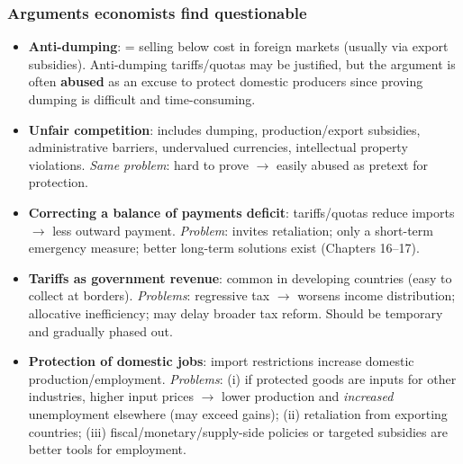 \subsubsection*{Arguments economists find questionable}
\begin{itemize}
  \item \textbf{Anti-dumping}:  = selling below cost in foreign markets (usually via export subsidies). Anti-dumping tariffs/quotas may be justified, but the argument is often \textbf{abused} as an excuse to protect domestic producers since proving dumping is difficult and time-consuming.
  \item \textbf{Unfair competition}: includes dumping, production/export subsidies, administrative barriers, undervalued currencies, intellectual property violations. \textit{Same problem}: hard to prove $\to$ easily abused as pretext for protection.
  \item \textbf{Correcting a balance of payments deficit}: tariffs/quotas reduce imports $\to$ less outward payment. \textit{Problem}: invites retaliation; only a short-term emergency measure; better long-term solutions exist (Chapters 16--17).
  \item \textbf{Tariffs as government revenue}: common in developing countries (easy to collect at borders). \textit{Problems}: regressive tax $\to$ worsens income distribution; allocative inefficiency; may delay broader tax reform. Should be temporary and gradually phased out.
  \item \textbf{Protection of domestic jobs}: import restrictions increase domestic production/employment. \textit{Problems}: (i) if protected goods are inputs for other industries, higher input prices $\to$ lower production and \textit{increased} unemployment elsewhere (may exceed gains); (ii) retaliation from exporting countries; (iii) fiscal/monetary/supply-side policies or targeted subsidies are better tools for employment.
\end{itemize}

